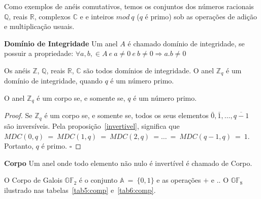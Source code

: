 \begin{example}
Como exemplos de anéis comutativos, temos os conjuntos dos números racionais $\mathbb{Q}$, reais $\mathbb{R}$, complexos $\mathbb{C}$ e e inteiros $mod\ q$ ($q$ é primo) sob as operações de adição e multiplicação usuais.
\end{example}

\begin{definition} {\bf Domínio de Integridade} \label{DomInt}  Um anel $A$ é chamado domínio de integridade, se possuir a propriedade: $\forall a,b, \in A\ e\ a\neq 0\ e\ b \neq 0 \Longrightarrow a.b \neq 0$
\end{definition}

\begin{example} Os anéis $\mathbb{Z}$, $\mathbb{Q}$, reais $\mathbb{R}$, $\mathbb{C}$ são todos domínios de integridade. O anel $\mathbb{Z}_q$ é um domínio de integridade, quando $q$ é um número primo.
\end{example}

\begin{theorem} O anel $\mathbb{Z}_q$  é um corpo se, e somente se, $q$ é um número primo.
\end{theorem}

\begin{proof}
Se $\mathbb{Z}_q$ é um corpo se, e somente se, todos os seus elementos $\bar{0}, \bar{1}, \ldots , \overline{q-1}$ são inversíveis. Pela proposição~\ref{invertivel}, significa que  $MDC(0,q)\ =\ MDC(1,q)\ =\ MDC(2,q)\ = \ldots \ =\ MDC(q-1,q)\ =\ 1$. Portanto, $q$ é primo. $\square$
\end{proof}

\begin{definition} {\bf Corpo} \label{corpo}  Um anel onde todo elemento não nulo é invertível é chamado de Corpo.
\end{definition}

\begin{example} O Corpo de Galois $\mathbb{GF}_2$ é o conjunto $\mathbb{A}\ =\ \{0, 1\}$ e as operações $+$ e $.$. O $\mathbb{GF}_8$ ilustrado nas tabelas~\ref{tab5:comp} e~\ref{tab6:comp}.
\end{example}

   
   


